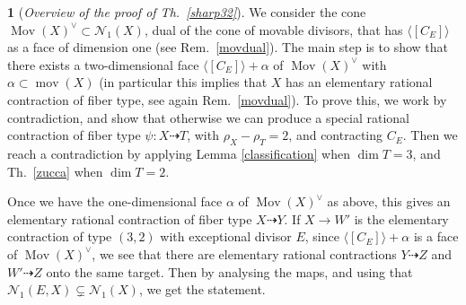 \documentclass[a4paper,12pt]{amsart}
\theoremstyle{definition}
\newtheorem{prg}[thm]{}
\numberwithin{figure}{section}
\numberwithin{table}{section}
\newcommand{\N}{\mathcal{N}_1}
\newcommand{\Mov}{\operatorname{Mov}}
\newcommand{\mov}{\operatorname{mov}}
\begin{document}
\begin{prg}[\em Overview of the proof of Th.~\ref{sharp32}]\label{overviewsharp32}
We consider the cone $\Mov(X)^{\vee}\subset\N(X)$, dual of the cone of movable divisors, that has $\langle [C_E]\rangle$ as a face of dimension one (see Rem.~\ref{movdual}). The main step is to show that there exists a two-dimensional face $\langle [C_E]\rangle+\alpha$ of $\Mov(X)^{\vee}$ with $\alpha\subset\mov(X)$ (in particular this implies that $X$ has an elementary rational contraction of fiber type, see again Rem.~\ref{movdual}).
To prove this, we work by contradiction, and show that otherwise we can produce a special rational contraction of fiber type $\psi\colon X\dasharrow T$, with $\rho_X-\rho_T=2$, and contracting $C_E$. Then we reach a contradiction by applying Lemma \ref{classification} when $\dim T=3$, and Th.~\ref{zucca} when $\dim T=2$.

Once we have the one-dimensional face $\alpha$ of $\Mov(X)^{\vee}$ as above, this gives an elementary rational contraction of fiber type $X\dasharrow Y$. If $X\to W'$ is the elementary contraction of type $(3,2)$ with exceptional divisor $E$, since  $\langle [C_E]\rangle+\alpha$ is a face of $\Mov(X)^{\vee}$, we see that there are elementary rational contractions $Y\dasharrow Z$ and $W'\dasharrow Z$ onto the same target. Then by analysing the maps, and using that $\N(E,X)\subsetneq\N(X)$, we get the statement.
\end{prg}
\end{document}

